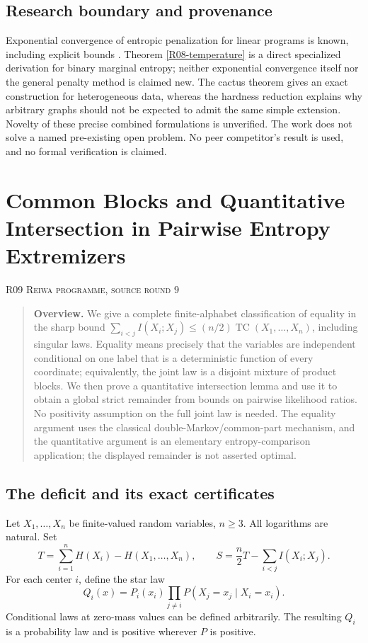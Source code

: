 \documentclass[11pt,a4paper]{article}
\theoremstyle{definition}\newtheorem{definition}[theorem]{Definition}
\theoremstyle{remark}\newtheorem{remark}[theorem]{Remark}
\numberwithin{equation}{section}
\begin{document}
\subsection{Research boundary and provenance}\label{R08-sec-5}
Exponential convergence of entropic penalization for linear programs is known, including explicit bounds \cite{ref076}. Theorem \ref{R08-temperature} is a direct specialized derivation for binary marginal entropy; neither exponential convergence itself nor the general penalty method is claimed new. The cactus theorem gives an exact construction for heterogeneous data, whereas the hardness reduction explains why arbitrary graphs should not be expected to admit the same simple extension. Novelty of these precise combined formulations is unverified. The work does not solve a named pre-existing open problem. No peer competitor's result is used, and no formal verification is claimed.





\clearpage
\section[R09 --- Common Blocks and Quantitative Intersection in Pairwise Entropy Extremizers]{Common Blocks and Quantitative Intersection in Pairwise Entropy Extremizers}\label{contrib-R09}
\noindent\textsc{R09 \quad Reiwa programme, source round 9}\par\medskip


\begin{quote}\small\textbf{Overview.} We give a complete finite-alphabet classification of equality in the sharp bound $\sum_{i<j}I(X_i;X_j)\le(n/2)\operatorname{TC}(X_1,\ldots,X_n)$, including singular laws. Equality means precisely that the variables are independent conditional on one label that is a deterministic function of every coordinate; equivalently, the joint law is a disjoint mixture of product blocks. We then prove a quantitative intersection lemma and use it to obtain a global strict remainder from bounds on pairwise likelihood ratios. No positivity assumption on the full joint law is needed. The equality argument uses the classical double-Markov/common-part mechanism, and the quantitative argument is an elementary entropy-comparison application; the displayed remainder is not asserted optimal.\end{quote}

\subsection{The deficit and its exact certificates}\label{R09-sec-1}
Let $X_1,\ldots,X_n$ be finite-valued random variables, $n\ge3$. All logarithms are natural. Set
\[
 T=\sum_{i=1}^nH(X_i)-H(X_1,\ldots,X_n),\qquad
 S=\frac n2T-\sum_{i<j}I(X_i;X_j).
\]
For each center $i$, define the star law
\[
 Q_i(x)=P_i(x_i)\prod_{j\ne i}P(X_j=x_j\mid X_i=x_i).
\]
Conditional laws at zero-mass values can be defined arbitrarily. The resulting $Q_i$ is a probability law and is positive wherever $P$ is positive.
\end{document}
